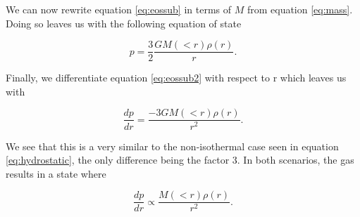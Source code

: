 \documentclass[a4paper]{article}
\begin{document}
\noindent We can now rewrite equation \eqref{eq:eossub} in terms of $M $ from equation 
\eqref{eq:mass}. Doing so leaves us with the following equation of state

\begin{equation}\label{eq:eossub2}
    p = \frac{3}{2} \frac{G M (<r) \rho (r)}{r}.
\end{equation}

\noindent Finally, we differentiate equation \eqref{eq:eossub2} with respect to r which 
leaves us with 

\begin{equation}\label{eq:isohydro}
    \frac{dp}{dr} = \frac{-3GM(<r) \rho(r)}{r^2}.
\end{equation}

\noindent We see that this is a very similar to the non-isothermal case seen in equation \eqref{eq:hydrostatic}, the only difference being the factor 3. In both scenarios, the gas results in a state where

\begin{equation}\label{eq:hydroprop}
    \frac{dp}{dr} \propto \frac{M(<r)\rho(r)}{r^2}.
\end{equation}
\end{document}
